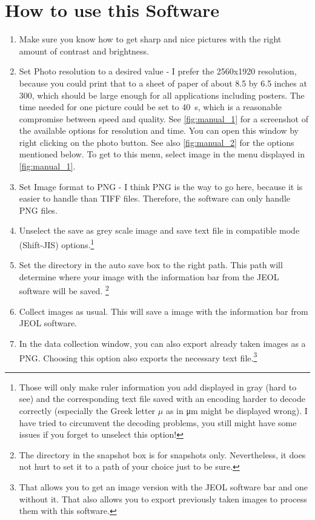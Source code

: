 \documentclass[english]{scrartcl}
\begin{document}
\section{How to use this Software}
\begin{enumerate}
	\item Make sure you know how to get sharp and nice pictures with the right amount of contrast and brightness.
	\item Set Photo resolution to a desired value - I prefer the 2560x1920 resolution, because you could print that to a sheet of paper of about 8.5 by 6.5 inches at \SI{300}{\dpi}, which should be large enough for all applications including posters. The time needed for one picture could be set to \SI{40}{\second}, which is a reasonable compromise between speed and quality. See \autoref{fig:manual_1} for a screenshot of the available options for resolution and time. You can open this window by right clicking on the photo button. See also \autoref{fig:manual_2} for the options mentioned below. To get to this menu, select image in the menu displayed in \autoref{fig:manual_1}.
	\item Set Image format to PNG - I think PNG is the way to go here, because it is easier to handle than TIFF files. Therefore, the software can only handle PNG files.
	\item Unselect the save as grey scale image and save text file in compatible mode (Shift-JIS) options.\footnote{Those will only make ruler information you add displayed in gray (hard to see) and the corresponding text file saved with an encoding harder to decode correctly (especially the Greek letter $\mu$ as in \si{\micro\metre} might be displayed wrong). I have tried to circumvent the decoding problems, you still might have some issues if you forget to unselect this option!}
	\item Set the directory in the auto save box to the right path. This path will determine where your image with the information bar from the JEOL software will be saved. \footnote{The directory in the snapshot box is for snapshots only. Nevertheless, it does not hurt to set it to a path of your choice just to be sure.}
	\item Collect images as usual. This will save a image with the information bar from JEOL software.
	\item In the data collection window, you can also export already taken images as a PNG. Choosing this option also exports the necessary text file.\footnote{That allows you to get an image version with the JEOL software bar and one without it. That also allows you to export previously taken images to process them with this software.}

\end{enumerate}
\end{document}
